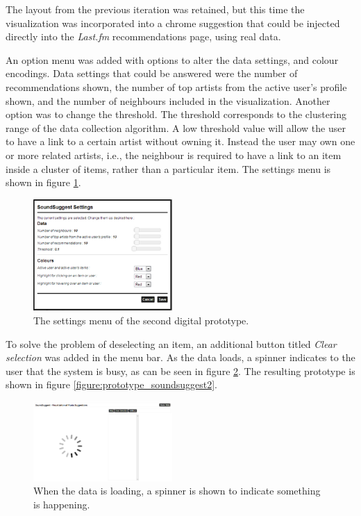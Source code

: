 The layout from the previous iteration was retained, but this time the visualization was incorporated into a chrome suggestion that could be injected directly into the \emph{Last.fm} recommendations page, using real data.

An option menu was added with options to alter the data settings, and colour encodings. Data settings that could be answered were the number of recommendations shown, the number of top artists from the active user's profile shown, and the number of neighbours included in the visualization. Another option was to change the threshold. The threshold corresponds to the clustering range of the data collection algorithm. A low threshold value will allow the user to have a link to a certain artist without owning it. Instead the user may own one or more related artists, i.e., the neighbour is required to have a link to an item inside a cluster of items, rather than a particular item. The settings menu is shown in figure \ref{figure:prototype_soundsuggest2_settings}.

\begin{figure}%
	\begin{center}
		\includegraphics[width=200px]{img/prototype_soundsuggest2_settings}%
	\end{center}
	\caption{The settings menu of the second digital prototype.}%
	\label{figure:prototype_soundsuggest2_settings}%
\end{figure}


To solve the problem of deselecting an item, an additional button titled \emph{Clear selection} was added in the menu bar. As the data loads, a spinner indicates to the user that the system is busy, as can be seen in figure \ref{figure:prototype_soundsuggest2_loading_data}. The resulting prototype is shown in figure \ref{figure:prototype_soundsuggest2}.

\begin{figure}%
	\begin{center}
		\includegraphics[width=200px]{img/prototype_soundsuggest2_loading_data}%
	\end{center}
	\caption{When the data is loading, a spinner is shown to indicate something is happening.}%
	\label{figure:prototype_soundsuggest2_loading_data}%
\end{figure}


